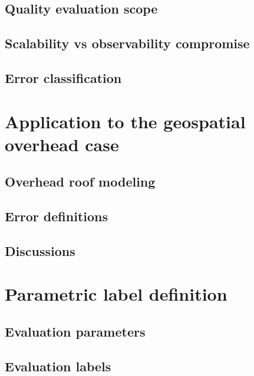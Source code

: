     \subsection{Quality evaluation scope}
    \subsection{Scalability vs observability compromise}
    \subsection{Error classification}
\section{Application to the geospatial overhead case}
    \subsection{Overhead roof modeling}
    \subsection{Error definitions}
    \subsection{Discussions}
\section{Parametric label definition}
    \subsection{Evaluation parameters}
    \subsection{Evaluation labels}

